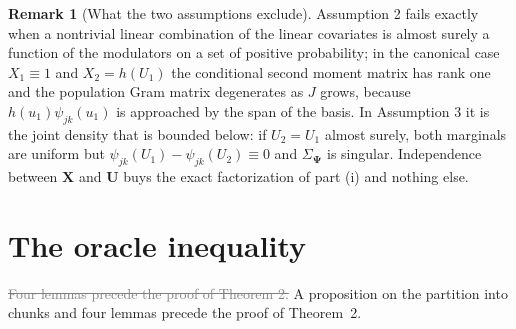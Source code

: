 \documentclass[10pt]{book}
\theoremstyle{definition}
\newtheorem{remark}{Remark}[section]
\newcommand{\lev}{j}
\newcommand{\tsl}{k}
\newcommand{\bX}{\mathbf{X}}
\newcommand{\bU}{\mathbf{U}}
\newcommand{\wav}[2]{\psi_{#1#2}}
\newcommand{\Gram}{\Sigma}
\newcommand{\bPsi}{\boldsymbol{\Psi}}
\begin{document}
\begin{remark}[What the two assumptions exclude]
\label{rem:excl}
Assumption 2 fails exactly when a nontrivial linear combination of the linear
covariates is almost surely a function of the modulators on a set of positive
probability; in the canonical case $X_1\equiv1$ and $X_2 = h(U_1)$ the
conditional second moment matrix has rank one and the population Gram matrix
degenerates as $J$ grows, because $h(u_1)\wav{\lev}{\tsl}(u_1)$ is approached
by the span of the basis. In Assumption 3 it is the joint density that is
bounded below: if $U_2 = U_1$ almost surely, both marginals are uniform but
$\wav{\lev}{\tsl}(U_1)-\wav{\lev}{\tsl}(U_2) \equiv 0$ and
$\Gram_{\bPsi}$ is singular. Independence between $\bX$ and $\bU$ buys the
exact factorization of part (i) and nothing else.
\end{remark}

\section{The oracle inequality}
\setcounter{equation}{0}

{\color{gray}\noindent[k = 4: the calibration lemma of the lasso, the proof of
Theorem~2 for the lasso, the remark on the cone and the corollary that
instantiates the design condition, which stood in this section, are moved to
Section~S8, unchanged except for the numbering of the results they cite;
Lemmas~S5.1, S5.3 and S5.4 stay, the first extended to the penalty of
equation~(2.5).]\par}

\textcolor{gray}{\sout{Four lemmas precede the proof of Theorem 2.}}
\textcolor{colR1}{A proposition on the partition into chunks and four lemmas
precede the proof of Theorem~2.}
\end{document}
